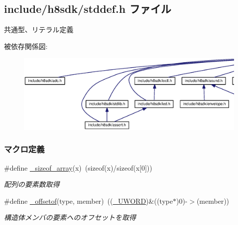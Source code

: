 \subsection{include/h8sdk/stddef.h ファイル}
\label{stddef_8h}


共通型、リテラル定義  


被依存関係図\+:
\nopagebreak
\begin{figure}[H]
\begin{center}
\leavevmode
\includegraphics[width=350pt]{d8/dff/stddef_8h__dep__incl}
\end{center}
\end{figure}
\subsubsection*{マクロ定義}
\begin{DoxyCompactItemize}
\item 
\#define \hyperlink{stddef_8h_afe7ee50840237d09629b5e8d0e5f80f2_afe7ee50840237d09629b5e8d0e5f80f2}{\+\_\+sizeof\+\_\+array}(x)~(sizeof(x)/sizeof(x\mbox{[}0\mbox{]}))
\begin{DoxyCompactList}\small\item\em 配列の要素数取得 \end{DoxyCompactList}\item 
\#define \hyperlink{stddef_8h_a8bbac17199ecc3ae9b3e09e3837d119f_a8bbac17199ecc3ae9b3e09e3837d119f}{\+\_\+offsetof}(type,  member)~((\hyperlink{stddef_8h_af4b45f5ec97da370bd2173b4fe891d76_af4b45f5ec97da370bd2173b4fe891d76}{\+\_\+\+U\+W\+O\+R\+D})\&((type$\ast$)0)-\/$>$(member))
\begin{DoxyCompactList}\small\item\em 構造体メンバの要素へのオフセットを取得 \end{DoxyCompactList}\end{DoxyCompactItemize}
